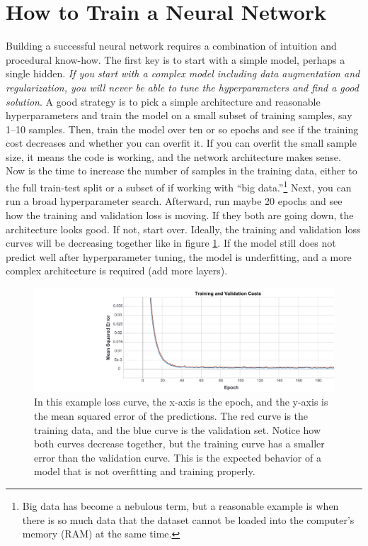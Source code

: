 \section{How to Train a Neural Network}
Building a successful neural network requires a combination of intuition and procedural know-how. The first key is to start with a simple model, perhaps a single hidden. \textit{If you start with a complex model including data augmentation and regularization, you will never be able to tune the hyperparameters and find a good solution}. A good strategy is to pick a simple architecture and reasonable hyperparameters and train the model on a small subset of training samples, say 1--10 samples. Then, train the model over ten or so epochs and see if the training cost decreases and whether you can overfit it. If you can overfit the small sample size, it means the code is working, and the network architecture makes sense. Now is the time to increase the number of samples in the training data, either to the full train-test split or a subset of if working with ``big data.''\footnote{Big data has become a nebulous term, but a reasonable example is when there is so much data that the dataset cannot be loaded into the computer's memory (RAM) at the same time.} Next, you can run a broad hyperparameter search. Afterward, run maybe 20 epochs and see how the training and validation loss is moving. If they both are going down, the architecture looks good. If not, start over. Ideally, the training and validation loss curves will be decreasing together like in figure \ref{fig:Example-Training-Loss-Curve}. If the model still does not predict well after hyperparameter tuning, the model is underfitting, and a more complex architecture is required (add more layers).

\begin{figure}
    \includegraphics[width=\linewidth]{Chapters/Figures/epoch_loss1.pdf}
    \caption[Example ANN Training Curve]{In this example loss curve, the x-axis is the epoch, and the y-axis is the mean squared error of the predictions. The red curve is the training data, and the blue curve is the validation set. Notice how both curves decrease together, but the training curve has a smaller error than the validation curve. This is the expected behavior of a model that is not overfitting and training properly.}
    \label{fig:Example-Training-Loss-Curve}
\end{figure}

